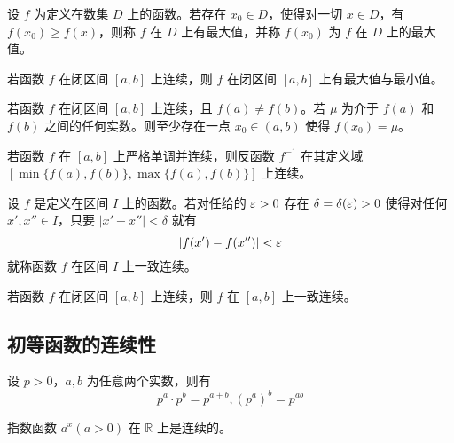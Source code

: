 \begin{definition}
    设 $f$ 为定义在数集 $D$ 上的函数。若存在 $x_0\in D$，使得对一切 $x\in D$，有 $f(x_0)\ge f(x)$，则称 $f$ 在 $D$ 上有最大值，并称 $f(x_0)$ 为 $f$ 在 $D$ 上的最大值。
\end{definition}

\begin{theorem}[最大、最小值定理]
    若函数 $f$ 在闭区间 $[a,b]$ 上连续，则 $f$ 在闭区间 $[a,b]$ 上有最大值与最小值。
\end{theorem}

\begin{theorem}[介值定理]
    若函数 $f$ 在闭区间 $[a,b]$ 上连续，且 $f(a)\ne f(b)$。若 $\mu$ 为介于 $f(a)$ 和 $f(b)$ 之间的任何实数。则至少存在一点 $x_0\in (a,b)$ 使得 $f(x_0)=\mu$。
\end{theorem}

\begin{theorem}
    若函数 $f$ 在 $[a,b]$ 上严格单调并连续，则反函数 $f^{-1}$ 在其定义域 $[\min\{f(a),f(b)\},\max\{f(a),f(b)\}]$ 上连续。
\end{theorem}

\begin{definition}
    设 $f$ 是定义在区间 $I$ 上的函数。若对任给的 $\varepsilon>0$ 存在 $\delta=\delta(\varepsilon)>0$ 使得对任何 $x',x''\in I$，只要 $|x'-x''|<\delta$ 就有
    $$|f(x')-f(x'')|<\varepsilon$$
    就称函数 $f$ 在区间 $I$ 上一致连续。
\end{definition}

\begin{theorem}[一致连续性]
    若函数 $f$ 在闭区间 $[a,b]$ 上连续，则 $f$ 在 $[a,b]$ 上一致连续。
\end{theorem}

\subsection{初等函数的连续性}

\begin{theorem}
    设 $p>0$，$a,b$ 为任意两个实数，则有
    $$p^a\cdot p^b = p^{a+b},(p^a)^b=p^{ab}$$
\end{theorem}

\begin{theorem}
    指数函数 $a^x(a>0)$ 在 $\mathbb{R}$ 上是连续的。
\end{theorem}


